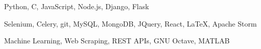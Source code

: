 

\begin{comment}

\begin{itemize}
  \item{\footnotesize Python, C, JavaScript, Django, Flask, Node.js}
  \item{\footnotesize Selenium, Celery, git, MySQL, MongoDB, JQuery, CSS, \LaTeX}
  \item{\footnotesize Machine Learning, Web Scraping, REST APIs, GNU Octave}
\end{itemize}

\end{comment}

\begin{cvhonors}

  \cvhonor
    {} %
    {Python, C, JavaScript, Node.js, Django, Flask} %
    {} %
    {\bullet} %

  \cvhonor
    {} %
    {Selenium, Celery, git, MySQL, MongoDB, JQuery, React, \LaTeX, Apache Storm} %
    {} %
    {\bullet} %

  \cvhonor
    {} %
    {Machine Learning, Web Scraping, REST APIs, GNU Octave, MATLAB} %
    {} %
    {\bullet} %

\end{cvhonors}
